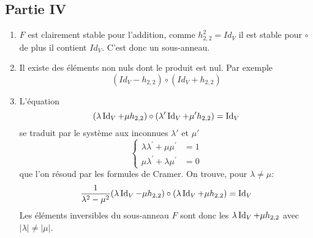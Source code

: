 \subsection*{Partie IV}
\begin{enumerate}
\item $F$ est clairement stable pour l'addition, comme $h_{2,2}^2=Id_V$ il est stable pour $\circ$ de plus il contient $Id_V$. C'est donc un sous-anneau.
\item Il existe des éléments non nuls dont le produit est nul. Par exemple
\[(Id_V-h_{2,2})\circ (Id_V+h_{2,2})\]
\item L'équation
\[(\lambda \operatorname{Id}_V+ \mu h_{2,2})\circ (\lambda ^\prime \operatorname{Id}_V+\mu^\prime h_{2,2})= \operatorname{Id}_V\]
se traduit par le système aux inconnues $\lambda'$ et $\mu'$
\begin{displaymath}
\left\lbrace \begin{aligned}
\lambda \lambda^\prime +\mu \mu^\prime &=1  \\ 
 \mu \lambda^\prime +\lambda \mu ^\prime&=0 
\end{aligned}\right. 
\end{displaymath}
que l'on résoud par les formules de Cramer. On trouve, pour $\lambda\neq \mu$:
\[\frac{1}{\lambda^2-\mu^2}(\lambda \operatorname{Id}_V - \mu h_{2,2})\circ (\lambda \operatorname{Id}_V + \mu h_{2,2})= \operatorname{Id}_V\]
Les éléments inversibles du sous-anneau $F$ sont donc les $\lambda \operatorname{Id}_V + \mu h_{2,2}$ avec $|\lambda|\neq |\mu|$.
\end{enumerate}


